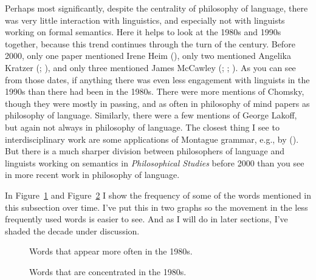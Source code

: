 \documentclass[
  10pt,
  letterpaper,
  DIV=11,
  numbers=noendperiod,
  twoside]{scrartcl}
\begin{document}
Perhaps most significantly, despite the centrality of philosophy of
language, there was very little interaction with linguistics, and
especially not with linguists working on formal semantics. Here it helps
to look at the 1980s and 1990s together, because this trend continues
through the turn of the century. Before 2000, only one paper mentioned
Irene Heim (), only two
mentioned Angelika Kratzer (; ), and only three
mentioned James McCawley (; ;
). As you can see from
those dates, if anything there was even less engagement with linguists
in the 1990s than there had been in the 1980s. There were more mentions
of Chomsky, though they were mostly in passing, and as often in
philosophy of mind papers as philosophy of language. Similarly, there
were a few mentions of George Lakoff, but again not always in philosophy
of language. The closest thing I see to interdisciplinary work are some
applications of Montague grammar, e.g., by
(). But there is a much
sharper division between philosophers of language and linguists working
on semantics in \emph{Philosophical Studies} before 2000 than you see in
more recent work in philosophy of language.

In Figure~\ref{fig-1980s-words-big} and
Figure~\ref{fig-1980s-words-small} I show the frequency of some of the
words mentioned in this subsection over time. I've put this in two
graphs so the movement in the less frequently used words is easier to
see. And as I will do in later sections, I've shaded the decade under
discussion.

\begin{figure}


\caption{\label{fig-1980s-words-big}Words that appear more often in the
1980s.}

\end{figure}%

\begin{figure}


\caption{\label{fig-1980s-words-small}Words that are concentrated in the
1980s.}

\end{figure}%
\end{document}

